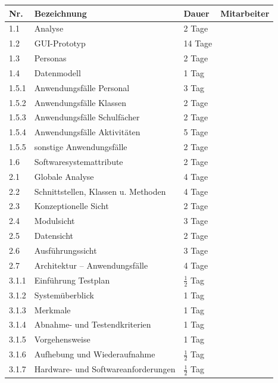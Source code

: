 \documentclass[fontsize=12pt,paper=a4,twoside]{scrartcl}
\begin{document}
\begin{tabularx}{\textwidth}{|p{1cm}|p{5.5cm}|p{2cm}|X|}
\hline \textbf{Nr.} &\textbf{Bezeichnung} & \textbf{Dauer} & \textbf{Mitarbeiter} \\
\hline 		1.1 	& Analyse		                		&	2 Tage		&  \\
\hline 		1.2 	& GUI-Prototyp                  		&	14 Tage		&  \\
\hline 		1.3 	& Personas	                    		&   2 Tage      &  \\
\hline 		1.4 	& Datenmodell	                		&   1 Tag       &  \\
\hline 		1.5.1 	& Anwendungsfälle Personal      		&   3 Tag	    &  \\
\hline 		1.5.2 	& Anwendungsfälle Klassen       		&   2 Tage      &  \\
\hline 		1.5.3 	& Anwendungsfälle Schulfächer			&	2 Tage		&  \\
\hline 		1.5.4 	& Anwendungsfälle Aktivitäten			&	5 Tage		&  \\
\hline 		1.5.5	& sonstige Anwendungsfälle      		&	2 Tage		&  \\
\hline 		1.6 	& Softwaresystemattribute       		&	2 Tage	    &  \\
\hline		2.1		& Globale Analyse						&	4 Tage		&  \\
\hline 		2.2		& Schnittstellen, Klassen u. Methoden 	& 	4 Tage		&  \\
\hline 		2.3		& Konzeptionelle Sicht					& 	2 Tage		&  \\
\hline		2.4		& Modulsicht							&   3 Tage		&  \\
\hline 		2.5		& Datensicht							& 	2 Tage		&  \\
\hline 		2.6		& Ausführungssicht						& 	3 Tage		&  \\
\hline		2.7		& Architektur -- Anwendungsfälle		&	4 Tage		&	\\
\hline		3.1.1	& Einführung Testplan					& $\frac{1}{2}$ Tag & \\
\hline 		3.1.2	& Systemüberblick						&   1 Tag		&  \\
\hline 		3.1.3	& Merkmale								&	1 Tag		&	\\
\hline 		3.1.4	& Abnahme- und Testendkriterien			&	1 Tag		&	\\
\hline 		3.1.5	& Vorgehensweise						&	1 Tag		&	\\
\hline 		3.1.6	& Aufhebung und Wiederaufnahme			& $\frac{1}{2}$ Tag	&	\\
\hline 		3.1.7	& Hardware- und Softwareanforderungen	&$\frac{1}{2}$ Tag	&	\\
\hline
\end{tabularx}\clearpage
\end{document}
